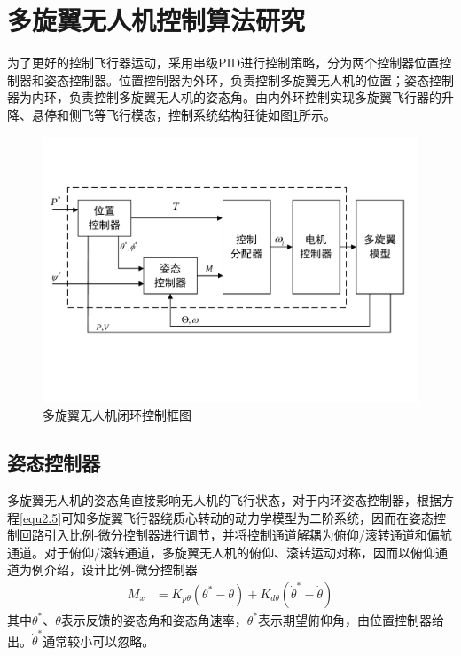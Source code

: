 \section{多旋翼无人机控制算法研究}
为了更好的控制飞行器运动，采用串级PID进行控制策略，分为两个控制器位置控制器和姿态控制器。位置控制器为外环，负责控制多旋翼无人机的位置；姿态控制器为内环，负责控制多旋翼无人机的姿态角。由内外环控制实现多旋翼飞行器的升降、悬停和侧飞等飞行模态，控制系统结构狂徒如图\ref{fig2.3}所示。
\begin{figure}[h]
\centering
\includegraphics[scale=0.5,angle=-90]{figures/Fig2-3.pdf}
\caption{多旋翼无人机闭环控制框图}
\label{fig2.3}
\end{figure}

\subsection{姿态控制器}
多旋翼无人机的姿态角直接影响无人机的飞行状态，对于内环姿态控制器，根据方程\eqref{equ2.5}可知多旋翼飞行器绕质心转动的动力学模型为二阶系统，因而在姿态控制回路引入比例-微分控制器进行调节，并将控制通道解耦为俯仰/滚转通道和偏航通道。对于俯仰/滚转通道，多旋翼无人机的俯仰、滚转运动对称，因而以俯仰通道为例介绍，设计比例-微分控制器
\begin{equation}
\label{equ2.12}
\begin{aligned}
M_x &= K_{p\theta} \left( \theta^* - \theta \right) + K_{d\theta} \left( \dot{\theta}^* -  \dot{\theta} \right)
\end{aligned}
\end{equation}
其中$\theta^*$、$\dot{\theta}$表示反馈的姿态角和姿态角速率，$\theta^*$表示期望俯仰角，由位置控制器给出。$ \dot{\theta}^*$通常较小可以忽略。


